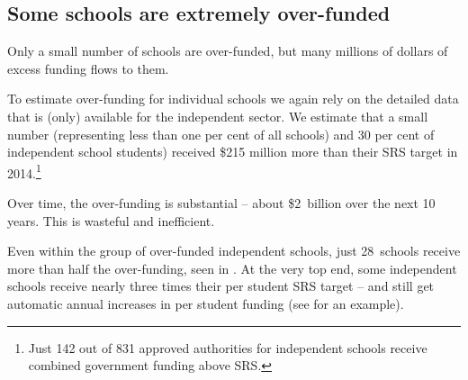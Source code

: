 \documentclass{grattan}
\begin{document}

\subsection{Some schools are extremely over-funded}\label{subsec:some-schools-are-extremely-over-funded}

Only a small number of schools are over-funded, but many millions of dollars of excess funding flows to them.

To estimate over-funding for individual schools we again rely on the detailed data that is (only) available for the independent sector. We estimate that a small number (representing less than one per cent of all schools) and 30 per cent of independent school students) received \$215 million more than their SRS target in 2014.\footnote{Just 142 out of 831 approved authorities for independent schools receive combined government funding above SRS\@.}

Over time, the over-funding is substantial -- about \$2~billion over the next 10 years.
This is wasteful and inefficient.

Even within the group of over-funded independent schools, just 28~schools receive more than half the over-funding, seen in . At the very top end, some independent schools receive nearly three times their per student SRS target -- and still get automatic annual increases in per student funding (see  for an example).
\end{document}
